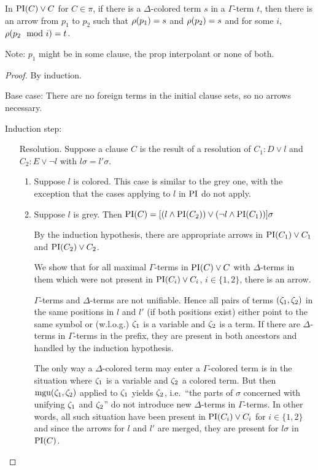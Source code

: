 \documentclass[,%
	paper=a4,%
	DIV12, %
	twoside=false,%
	liststotoc,
	bibtotoc,
	draft=false,%
	numbers=noendperiod
]{scrartcl}
\begin{document}
\begin{lemma}
	In $\operatorname{PI}(C)\lor C$ for $C \in \pi$, if there is a $\Delta$-colored term $s$ in a $\Gamma$-term $t$, then there is an arrow from $p_1$ to $p_2$ such that $\operatorname{{\rho}}(p_1) = s$ and $\operatorname{{\rho}}(p_2) = s$ and for some $i$, $\operatorname{{\rho}}( p_2 \mod i ) = t$.
\end{lemma}
Note: $p_1$ might be in some clause, the prop interpolant or none of both. 
\begin{proof}
	By induction.

	Base case: There are no foreign terms in the initial clause sets, so no arrows necessary.

	Induction step:

	\begin{itemize}
		\item[Resolution.]
			Suppose a clause $C$ is the result of a resolution of $C_1: D \lor l$ and $C_2: E \lor \lnot l$ with $l\sigma = l'\sigma$.

			\begin{enumerate}
				\item Suppose $l$ is colored. 
					This case is similar to the grey one, with the exception that the cases applying to $l$ in $\operatorname{PI}$ do not apply.

				\item Suppose $l$ is grey. Then  $\operatorname{PI}(C) = [(l \land \operatorname{PI}(C_2)) \lor (\lnot l \land \operatorname{PI}(C_1)) ] \sigma $

					By the induction hypothesis, there are appropriate arrows in $\operatorname{PI}(C_1) \lor C_1$ and $\operatorname{PI}(C_2) \lor C_2$.

					We show that for all maximal $\Gamma$-terms in $\operatorname{PI}(C)\lor C$ with $\Delta$-terms in them which were not present in $\operatorname{PI}(C_i)\lor C_i$, $i \in \{1,2\}$, there is an arrow.

					$\Gamma$-terms and $\Delta$-terms are not unifiable.
					Hence all pairs of terms $(\zeta_{1}, \zeta_{2})$ in the same positions in $l$ and $l'$ (if both positions exist) either point to the same symbol or (w.l.o.g.) $\zeta_{1}$ is a variable and $\zeta_{2}$ is a term.
					If there are $\Delta$-terms in $\Gamma$-terms in the prefix, they are present in both ancestors and handled by the induction hypothesis.

					The only way a $\Delta$-colored term may enter a $\Gamma$-colored term is in the situation where $\zeta_{1}$ is a variable and $\zeta_{2}$ a colored term.
					But then $\operatorname{mgu}(\zeta_{1}, \zeta_{2})$ applied to $\zeta_{1}$ yields $\zeta_{2}$, i.e.~``the parts of $\sigma$ concerned with unifying $\zeta_{1}$ and $\zeta_{2}$'' do not introduce new $\Delta$-terms in $\Gamma$-terms.
					In other words, all such situation have been present in $\operatorname{PI}(C_i) \lor C_i$ for $i \in \{1,2\}$ and since the arrows for $l$ and $l'$ are merged, they are present for $l\sigma$ in $\operatorname{PI}(C)$.


\end{enumerate}
\end{itemize}
\end{proof}
\end{document}
